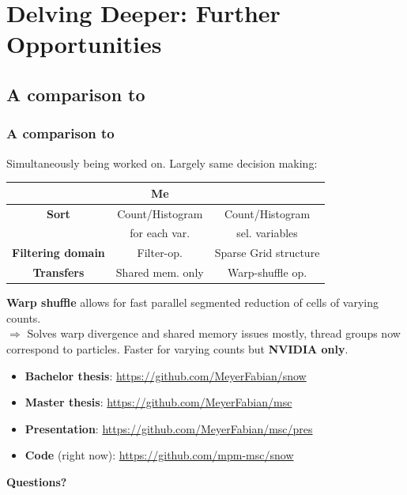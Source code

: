\documentclass{beamer}
\let\oldcite=\cite
\renewcommand{\cite}[1]{\textcolor[rgb]{.55,.55,.89}{\oldcite{#1}}}
\begin{document}
\section{Delving Deeper: Further Opportunities}
\subsection{A comparison to \cite{Gao:2018}}
\begin{frame}
  \frametitle{A comparison to \cite{Gao:2018}}

Simultaneously being worked on. Largely same decision making:\\
\begin{table}
\begin{tabular}{|c|c|c|}
    \hline
	   & \textbf{Me}              & \textbf{\cite{Gao:2018}} \\\hline
  \textbf{Sort}   & Count/Histogram & Count/Histogram \\
	   & for each var.   & sel. variables  \\\hline
  \textbf{Filtering domain}& Filter-op.& Sparse Grid structure \\\hline
  \textbf{Transfers}        & Shared mem. only & Warp-shuffle op.\\\hline
  \end{tabular}
\end{table}
\textbf{Warp shuffle} allows for fast parallel segmented reduction of cells of varying counts.\\
$\Rightarrow$ Solves warp divergence and shared memory issues mostly, thread groups now correspond to particles. Faster for varying counts but \textbf{NVIDIA only}.
\end{frame}
\begin{frame}
  \vfill
\begin{itemize}
  \item \textbf{Bachelor thesis}: \url{https://github.com/MeyerFabian/snow}
  \item \textbf{Master thesis}: \url{https://github.com/MeyerFabian/msc}
  \item \textbf{Presentation}: \url{https://github.com/MeyerFabian/msc/pres}
      \item \textbf{Code} (right now): \url{https://github.com/mpm-msc/snow}
\end{itemize}
\vfill
\centering
\textbf{Questions?}
\end{frame}

\printbibliography
\end{document}

